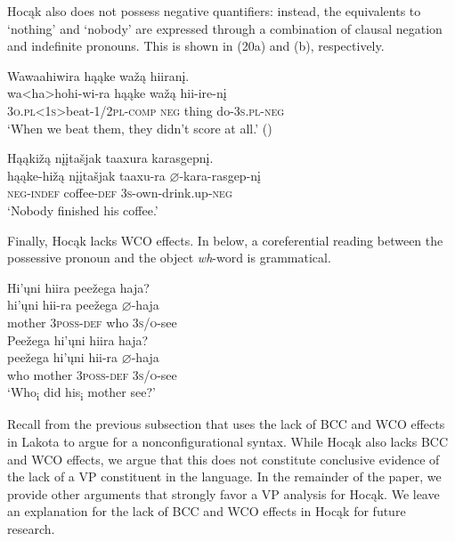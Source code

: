 \documentclass[output=paper]{LSP/langsci}
\begin{document}
Hocąk also does not possess negative quantifiers: instead, the equivalents to `nothing' and `nobody' are expressed through a combination of clausal negation and indefinite pronouns. This is shown in (20a) and (b), respectively.

\begin{exe}
\ex\label{ex:jrs:20}
\begin{xlist} 	
\ex
\glll Wawaahiwira 	hąąke 	wa\v{z}ą 	hiiran\k{i}. \\
wa<ha>hohi-wi-ra 						hąąke 	wa\v{z}ą 	hii-ire-n\k{i} \\
	\textsc{3o.pl<1s>}beat-\textsc{1/2pl}-\textsc{comp} \textsc{neg}		thing 	do-\textsc{3s.pl-neg} \\
\trans `When we beat them, they didn't score at all.' (\citealt{Hartmann2012}) 

\ex
\glll Hąąki\v{z}ą 	{n\k{i}\k{i}ta\v{s}jak taaxura} 	karasgepn\k{i}. \\
hąąke-hi\v{z}ą  {n\k{i}\k{i}ta\v{s}jak taaxu-ra }	$\varnothing$-kara-rasgep-n\k{i} \\
	\textsc{neg-indef} 	coffee-\textsc{def}	\textsc{3s}-own-drink.up-\textsc{neg} \\
\trans `Nobody finished his coffee.'
\end{xlist}
\end{exe}
	
Finally, Hocąk lacks WCO effects. In  below, a coreferential reading between the possessive pronoun and the object \textit{wh}-word is grammatical.

\begin{exe}
\ex\label{ex:jrs:21}
\begin{xlist} 	
\ex
\glll Hi'\k{u}ni		hiira					pee\v{z}ega		haja? \\
hi'\k{u}ni		hii-ra 			pee\v{z}ega		$\varnothing$-haja \\
	mother		3\textsc{poss-def}		who	\textsc{3s/o}-see \\ 
    
\ex
\glll Pee\v{z}ega 	hi'\k{u}ni 		hiira		haja?\\
pee\v{z}ega 	hi'\k{u}ni 		hii-ra 		$\varnothing$-haja \\
	who 	mother 	3\textsc{poss-def} 	\textsc{3s/o}-see \\
\trans `Who\textsubscript{i} did his\textsubscript{i} mother see?'
\end{xlist}
\end{exe}

Recall from the previous subsection that \citet{VanValin1985,VanValin1987} uses the lack of BCC and WCO effects in Lakota to argue for a nonconfigurational syntax. While Hocąk also lacks BCC and WCO effects, we argue that this does not constitute conclusive evidence of the lack of a VP constituent in the language. In the remainder of the paper, we provide other arguments that strongly favor a VP analysis for Hocąk. We leave an explanation for the lack of BCC and WCO effects in Hocąk for future research.
\end{document}
